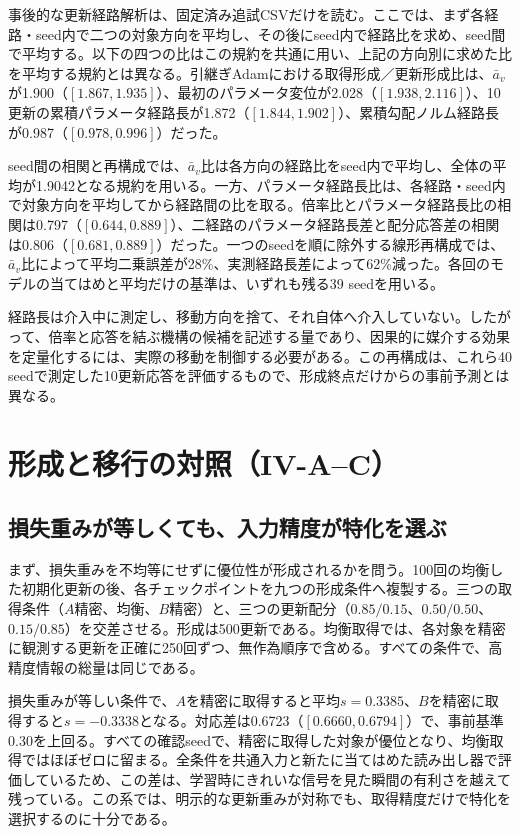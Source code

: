 事後的な更新経路解析は、固定済み追試CSVだけを読む。ここでは、まず各経路・seed内で二つの対象方向を平均し、その後にseed内で経路比を求め、seed間で平均する。以下の四つの比はこの規約を共通に用い、上記の方向別に求めた比を平均する規約とは異なる。引継ぎAdamにおける取得形成／更新形成比は、$\bar a_v$が1.900（$[1.867,1.935]$）、最初のパラメータ変位が2.028（$[1.938,2.116]$）、10更新の累積パラメータ経路長が1.872（$[1.844,1.902]$）、累積勾配ノルム経路長が0.987（$[0.978,0.996]$）だった。

seed間の相関と再構成では、$\bar a_v$比は各方向の経路比をseed内で平均し、全体の平均が1.9042となる規約を用いる。一方、パラメータ経路長比は、各経路・seed内で対象方向を平均してから経路間の比を取る。倍率比とパラメータ経路長比の相関は0.797（$[0.644,0.889]$）、二経路のパラメータ経路長差と配分応答差の相関は0.806（$[0.681,0.889]$）だった。一つのseedを順に除外する線形再構成では、$\bar a_v$比によって平均二乗誤差が28\%、実測経路長差によって62\%減った。各回のモデルの当てはめと平均だけの基準は、いずれも残る39 seedを用いる。

経路長は介入中に測定し、移動方向を捨て、それ自体へ介入していない。したがって、倍率と応答を結ぶ機構の候補を記述する量であり、因果的に媒介する効果を定量化するには、実際の移動を制御する必要がある。この再構成は、これら40 seedで測定した10更新応答を評価するもので、形成終点だけからの事前予測とは異なる。


\section{形成と移行の対照（IV-A--C）}
\label{sec:controls}
\label{app:formation}
\subsection{損失重みが等しくても、入力精度が特化を選ぶ}
まず、損失重みを不均等にせずに優位性が形成されるかを問う。100回の均衡した初期化更新の後、各チェックポイントを九つの形成条件へ複製する。三つの取得条件（$A$精密、均衡、$B$精密）と、三つの更新配分（$0.85/0.15$、$0.50/0.50$、$0.15/0.85$）を交差させる。形成は500更新である。均衡取得では、各対象を精密に観測する更新を正確に250回ずつ、無作為順序で含める。すべての条件で、高精度情報の総量は同じである。

損失重みが等しい条件で、$A$を精密に取得すると平均$s=0.3385$、$B$を精密に取得すると$s=-0.3338$となる。対応差は0.6723（$[0.6660,0.6794]$）で、事前基準0.30を上回る。すべての確認seedで、精密に取得した対象が優位となり、均衡取得ではほぼゼロに留まる。全条件を共通入力と新たに当てはめた読み出し器で評価しているため、この差は、学習時にきれいな信号を見た瞬間の有利さを越えて残っている。この系では、明示的な更新重みが対称でも、取得精度だけで特化を選択するのに十分である。

